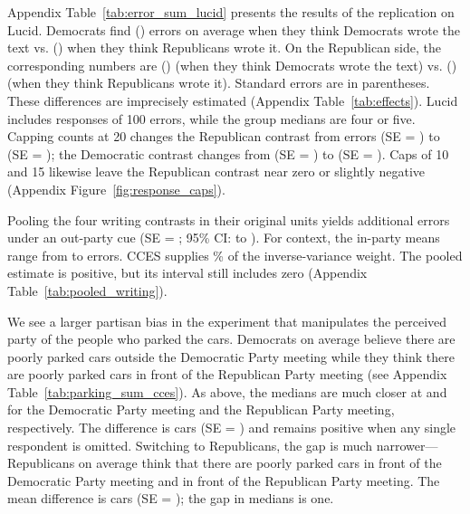 \documentclass[12pt, letterpaper]{article}
\begin{document}
Appendix Table~\ref{tab:error_sum_lucid} presents the results of the replication on Lucid. Democrats find \LucidWritingDemocratDemocratMean{} (\LucidWritingDemocratDemocratSe{}) errors on average when they think Democrats wrote the text vs. \LucidWritingDemocratRepublicanMean{} (\LucidWritingDemocratRepublicanSe{}) when they think Republicans wrote it. On the Republican side, the corresponding numbers are \LucidWritingRepublicanDemocratMean{} (\LucidWritingRepublicanDemocratSe{}) (when they think Democrats wrote the text) vs. \LucidWritingRepublicanRepublicanMean{} (\LucidWritingRepublicanRepublicanSe{}) (when they think Republicans wrote it). Standard errors are in parentheses. These differences are imprecisely estimated (Appendix Table~\ref{tab:effects}). Lucid includes \LucidHundredCount{} responses of 100 errors, while the group medians are four or five. Capping counts at 20 changes the Republican contrast from \LucidWritingRepublicanDifference{} errors (SE = \LucidWritingRepublicanDifferenceSe{}) to \CappedLucidRepublicanEstimate{} (SE = \CappedLucidRepublicanSe{}); the Democratic contrast changes from \LucidWritingDemocratDifference{} (SE = \LucidWritingDemocratDifferenceSe{}) to \CappedLucidDemocratEstimate{} (SE = \CappedLucidDemocratSe{}). Caps of 10 and 15 likewise leave the Republican contrast near zero or slightly negative (Appendix Figure~\ref{fig:response_caps}).

Pooling the four writing contrasts in their original units yields \PooledWritingAllpartisansEstimate{} additional errors under an out-party cue (SE = \PooledWritingAllpartisansSe{}; 95\% CI: \PooledWritingAllpartisansLower{} to \PooledWritingAllpartisansUpper{}). For context, the in-party means range from \WritingOwnMinimum{} to \WritingOwnMaximum{} errors. CCES supplies \PooledWritingCCESWeight{}\% of the inverse-variance weight. The pooled estimate is positive, but its interval still includes zero (Appendix Table~\ref{tab:pooled_writing}).


We see a larger partisan bias in the experiment that manipulates the perceived party of the people who parked the cars. Democrats on average believe there are \CCESParkingDemocratDemocratMean{} poorly parked cars outside the Democratic Party meeting while they think there are \CCESParkingDemocratRepublicanMean{} poorly parked cars in front of the Republican Party meeting (see Appendix Table~\ref{tab:parking_sum_cces}). As above, the medians are much closer at \CCESParkingDemocratDemocratMedian{} and \CCESParkingDemocratRepublicanMedian{} for the Democratic Party meeting and the Republican Party meeting, respectively. The difference is \CCESParkingDemocratDifference{} cars (SE = \CCESParkingDemocratDifferenceSe{}) and remains positive when any single respondent is omitted. Switching to Republicans, the gap is much narrower---Republicans on average think that there are \CCESParkingRepublicanDemocratMean{} poorly parked cars in front of the Democratic Party meeting and \CCESParkingRepublicanRepublicanMean{} in front of the Republican Party meeting. The mean difference is \CCESParkingRepublicanDifference{} cars (SE = \CCESParkingRepublicanDifferenceSe{}); the gap in medians is one.
\end{document}
